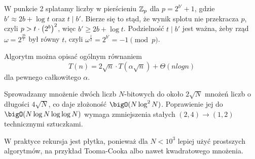 W punkcie 2 splatamy liczby w pierścieniu \( \mathbb{Z}_p \) dla \( p = 2^{b'} + 1 \), gdzie \( b' \approx 2b + \log t \) oraz \( t \mid b' \). Bierze się to stąd, że wynik splotu nie przekracza \( p \), czyli \( p > t \cdot \left(2^b\right)^2 \), więc \( b' \geq 2b + \log t \).
Podzielność \( t \mid b' \) jest ważna, żeby rząd \( \omega = 2^{\frac{2b}{t}} \) był równy \( t \), czyli \( \omega^{\frac{t}{2}} = 2^{b'} = -1 \pmod{p} \).

Algorytm można opisać ogólnym równaniem
\[
    T(n) = 2 \sqrt{n} \cdot T(\alpha \sqrt{n}) + \Theta(n log n)
\]
dla pewnego całkowitego \( \alpha \).

Sprowadzamy mnożenie dwóch liczb \( N \)-bitowych do około \( 2\sqrt{N} \) mnożeń liczb o długości \( 4\sqrt{N} \), co daje złożoność \( \bigO(N \log^2 N) \).
Poprawienie jej do \( \bigO(N \log N \log \log N) \) wymaga zmniejszenia stałych \( (2, 4) \rightarrow (1, 2) \) technicznymi sztuczkami.
        
W praktyce rekursja jest płytka, ponieważ dla \( N < 10^3 \) lepiej użyć prostszych algorytmów, na przykład Tooma-Cooka albo nawet kwadratowego mnożenia.
